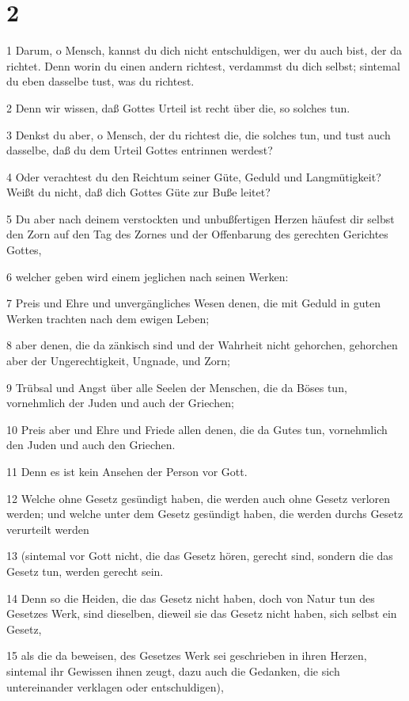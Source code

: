 \chapter{2}

\par 1 Darum, o Mensch, kannst du dich nicht entschuldigen, wer du auch bist, der da richtet. Denn worin du einen andern richtest, verdammst du dich selbst; sintemal du eben dasselbe tust, was du richtest.
\par 2 Denn wir wissen, daß Gottes Urteil ist recht über die, so solches tun.
\par 3 Denkst du aber, o Mensch, der du richtest die, die solches tun, und tust auch dasselbe, daß du dem Urteil Gottes entrinnen werdest?
\par 4 Oder verachtest du den Reichtum seiner Güte, Geduld und Langmütigkeit? Weißt du nicht, daß dich Gottes Güte zur Buße leitet?
\par 5 Du aber nach deinem verstockten und unbußfertigen Herzen häufest dir selbst den Zorn auf den Tag des Zornes und der Offenbarung des gerechten Gerichtes Gottes,
\par 6 welcher geben wird einem jeglichen nach seinen Werken:
\par 7 Preis und Ehre und unvergängliches Wesen denen, die mit Geduld in guten Werken trachten nach dem ewigen Leben;
\par 8 aber denen, die da zänkisch sind und der Wahrheit nicht gehorchen, gehorchen aber der Ungerechtigkeit, Ungnade, und Zorn;
\par 9 Trübsal und Angst über alle Seelen der Menschen, die da Böses tun, vornehmlich der Juden und auch der Griechen;
\par 10 Preis aber und Ehre und Friede allen denen, die da Gutes tun, vornehmlich den Juden und auch den Griechen.
\par 11 Denn es ist kein Ansehen der Person vor Gott.
\par 12 Welche ohne Gesetz gesündigt haben, die werden auch ohne Gesetz verloren werden; und welche unter dem Gesetz gesündigt haben, die werden durchs Gesetz verurteilt werden
\par 13 (sintemal vor Gott nicht, die das Gesetz hören, gerecht sind, sondern die das Gesetz tun, werden gerecht sein.
\par 14 Denn so die Heiden, die das Gesetz nicht haben, doch von Natur tun des Gesetzes Werk, sind dieselben, dieweil sie das Gesetz nicht haben, sich selbst ein Gesetz,
\par 15 als die da beweisen, des Gesetzes Werk sei geschrieben in ihren Herzen, sintemal ihr Gewissen ihnen zeugt, dazu auch die Gedanken, die sich untereinander verklagen oder entschuldigen),

